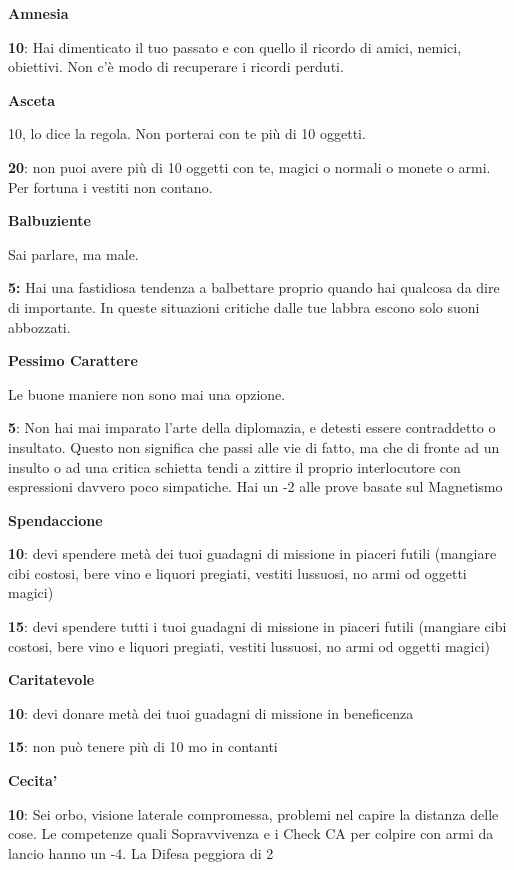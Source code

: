 \documentclass[a4paper,11pt,twoside,openany]{book}
\begin{document}
\textbf{Amnesia}

\textbf{10}: Hai dimenticato il tuo passato e con quello il ricordo di amici, nemici, obiettivi. Non c'è modo di recuperare i ricordi perduti.

\textbf{Asceta}

10, lo dice la regola. Non porterai con te più di 10 oggetti.

\textbf{20}: non puoi avere più di 10 oggetti con te, magici o normali o monete o armi. Per fortuna i vestiti non contano.

\textbf{Balbuziente}

Sai parlare, ma male.

\textbf{5:} Hai una fastidiosa tendenza a balbettare proprio quando hai qualcosa da dire di importante. In queste situazioni critiche dalle tue labbra escono solo suoni abbozzati.

\textbf{Pessimo Carattere}

Le buone maniere non sono mai una opzione.

\textbf{5}: Non hai mai imparato l'arte della diplomazia, e detesti essere contraddetto o insultato. Questo non significa che passi alle vie di fatto, ma che di fronte ad un insulto o ad una critica schietta tendi a zittire il proprio interlocutore con espressioni davvero poco simpatiche. Hai un -2 alle prove basate sul Magnetismo

\textbf{Spendaccione}

\textbf{10}: devi spendere metà dei tuoi guadagni di missione in piaceri futili (mangiare cibi costosi, bere vino e liquori pregiati, vestiti lussuosi, no armi od oggetti magici)

\textbf{15}: devi spendere tutti i tuoi guadagni di missione in piaceri futili (mangiare cibi costosi, bere vino e liquori pregiati, vestiti lussuosi, no armi od oggetti magici)

\textbf{Caritatevole}

\textbf{10}: devi donare metà dei tuoi guadagni di missione in beneficenza

\textbf{15}: non può tenere più di 10 mo in contanti

\textbf{Cecita'}

\textbf{10}: Sei orbo, visione laterale compromessa, problemi nel capire la distanza delle cose.
Le competenze quali Sopravvivenza e i Check CA per colpire con armi da lancio hanno
un -4. La Difesa peggiora di 2
\end{document}
